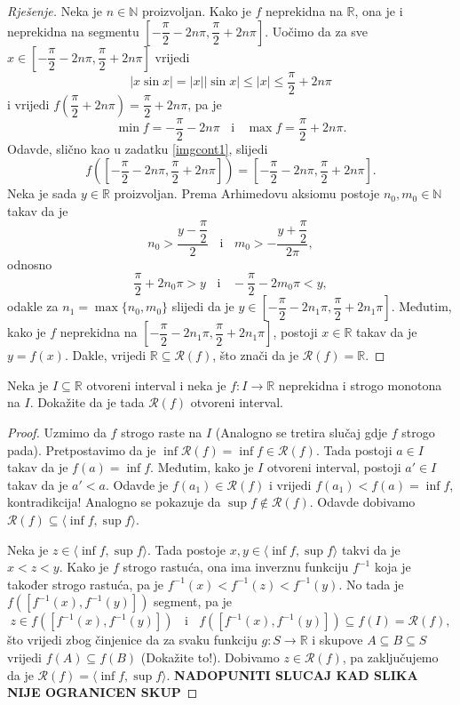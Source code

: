 \begin{proof}[Rješenje]
Neka je $n\in \mathbb{N}$ proizvoljan. Kako je $f$ neprekidna na $\mathbb{R}$, ona je i neprekidna na segmentu $\left[-\dfrac{\pi}{2}-2n\pi, \dfrac{\pi}{2}+2n\pi\right]$. Uočimo da za sve $x\in \left[-\dfrac{\pi}{2}-2n\pi, \dfrac{\pi}{2}+2n\pi\right]$ vrijedi 
$$|x\sin{x}|=|x||\sin{x}|\leq |x|\leq \dfrac{\pi}{2}+2n\pi$$
i vrijedi $f\left(\dfrac{\pi}{2}+2n\pi\right)=\dfrac{\pi}{2}+2n\pi$, pa je $$\min{f}=-\dfrac{\pi}{2}-2n\pi\;\;\text{ i }\;\;\max{f}=\dfrac{\pi}{2}+2n\pi.$$
Odavde, slično kao u zadatku \ref{imgcont1}, slijedi $$f\left(\left[-\dfrac{\pi}{2}-2n\pi, \dfrac{\pi}{2}+2n\pi\right]\right)=\left[-\dfrac{\pi}{2}-2n\pi, \dfrac{\pi}{2}+2n\pi\right].$$
Neka je sada $y\in \mathbb{R}$ proizvoljan. Prema Arhimedovu aksiomu postoje $n_0, m_0\in \mathbb{N}$ takav da je 
$$n_0>\dfrac{y-\dfrac{\pi}{2}}{2}\;\;\text{ i }\;\; m_0>-\dfrac{y+\dfrac{\pi}{2}}{2\pi},$$
odnosno
$$\dfrac{\pi}{2}+2n_0\pi>y\;\;\text{ i }\;\;-\dfrac{\pi}{2}-2m_0\pi<y,$$
odakle za $n_1=\max\{n_0, m_0\}$ slijedi da je $y\in \left[-\dfrac{\pi}{2}-2n_1\pi, \dfrac{\pi}{2}+2n_1\pi\right]$. Međutim, kako je $f$ neprekidna na $\left[-\dfrac{\pi}{2}-2n_1\pi, \dfrac{\pi}{2}+2n_1\pi\right]$, postoji $x\in \mathbb{R}$ takav da je $y=f(x)$. Dakle, vrijedi $\mathbb{R}\subseteq \mathcal{R}(f)$, što znači da je $\mathcal{R}(f)=\mathbb{R}$.
\end{proof}
\begin{exercise}
Neka je $I\subseteq \mathbb{R}$ otvoreni interval i neka je $f : I\to \mathbb{R}$ neprekidna i strogo monotona na $I$. Dokažite da je tada $\mathcal{R}(f)$ otvoreni interval.
\end{exercise}
\begin{proof}
Uzmimo da $f$ strogo raste na $I$ (Analogno se tretira slučaj gdje $f$ strogo pada). Pretpostavimo da je $\inf{\mathcal{R}(f)}=\inf{f}\in \mathcal{R}(f)$. Tada postoji $a\in I$ takav da je $f(a)=\inf{f}$. Međutim, kako je $I$ otvoreni interval, postoji $a'\in I$ takav da je $a'<a$. Odavde je $f(a_1)\in \mathcal{R}(f)$ i vrijedi $f(a_1)<f(a)=\inf{f}$, kontradikcija! Analogno se pokazuje da $\sup{f}\notin \mathcal{R}(f)$. Odavde dobivamo $\mathcal{R}(f)\subseteq \langle \inf{f}, \sup{f} \rangle$.

Neka je $z\in \langle \inf{f}, \sup{f} \rangle$. Tada postoje $x, y\in \langle \inf{f}, \sup{f} \rangle$ takvi da je $x<z<y$. Kako je $f$ strogo rastuća, ona ima inverznu funkciju $f^{-1}$ koja je također strogo rastuća, pa je $f^{-1}(x)<f^{-1}(z)<f^{-1}(y)$. No tada je $f\left(\left[f^{-1}(x), f^{-1}(y)\right]\right)$ segment, pa je $$z\in f\left(\left[f^{-1}(x), f^{-1}(y)\right]\right)\;\;\text{ i }\;\;f\left(\left[f^{-1}(x), f^{-1}(y)\right]\right)\subseteq f(I)=\mathcal{R}(f),$$
što vrijedi zbog činjenice da za svaku funkciju $g : S\to \mathbb{R}$ i skupove $A\subseteq B\subseteq S$ vrijedi $f(A)\subseteq f(B)$ (Dokažite to!).
Dobivamo $z\in \mathcal{R}(f)$, pa zaključujemo da je $\mathcal{R}(f)=\langle \inf{f}, \sup{f}\rangle$.
\textbf{NADOPUNITI SLUCAJ KAD SLIKA NIJE OGRANICEN SKUP}
\end{proof}

